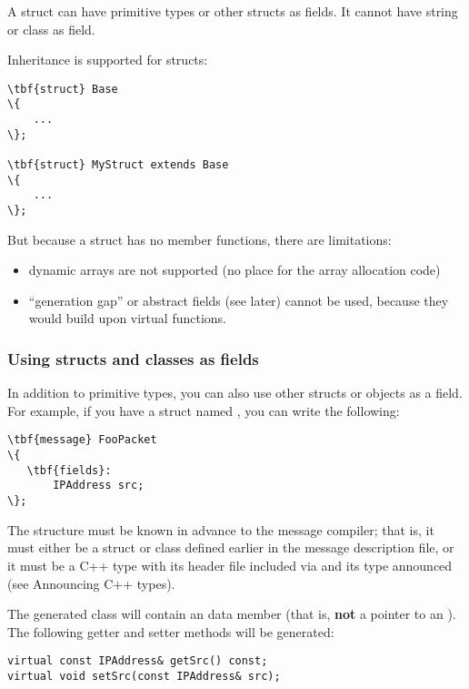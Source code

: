A struct can have primitive types or other structs as fields. It cannot
have string or class as field.

Inheritance is supported for structs:

\begin{Verbatim}[commandchars=\\\{\}]
\tbf{struct} Base
\{
    ...
\};

\tbf{struct} MyStruct extends Base
\{
    ...
\};
\end{Verbatim}

But because a struct has no member functions, there are limitations:

\begin{itemize}
   \item dynamic arrays are not supported (no place for the array allocation code)
   \item ``generation gap'' or abstract fields (see later) cannot be used,
      because they would build upon virtual functions.
\end{itemize}


\subsubsection{Using structs and classes as fields}

In addition to primitive types, you can also use other structs or objects
as a field. For example, if you have a struct named ,
you can write the following:

\begin{Verbatim}[commandchars=\\\{\}]
\tbf{message} FooPacket
\{
   \tbf{fields}:
       IPAddress src;
\};
\end{Verbatim}

The  structure must be known in advance to the message compiler;
that is, it must either be a struct or class defined earlier in the message
description file, or it must be a C++ type with its header file
included via  and its type announced
(see Announcing C++ types).

The generated class will contain an  data member
(that is, \textbf{not} a pointer to an ).
The following getter and setter methods will be generated:

\begin{verbatim}
virtual const IPAddress& getSrc() const;
virtual void setSrc(const IPAddress& src);
\end{verbatim}


